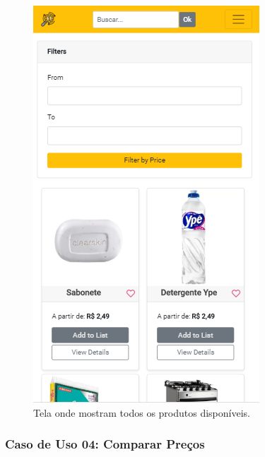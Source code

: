 \begin{figure}[!htb]
\centering
\caption{Tela onde mostram todos os produtos disponíveis.}
\includegraphics[width=\linewidth]{figuras/tela_lista_produtos.png}
\end{figure}

\subsubsection{Caso de Uso 04: Comparar Preços}

